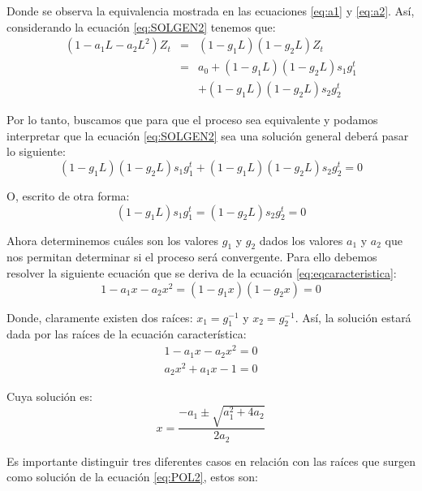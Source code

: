 \documentclass[
]{book}
\begin{document}
Donde se observa la equivalencia mostrada en las ecuaciones \eqref{eq:a1} y \eqref{eq:a2}. Así, considerando la ecuación \eqref{eq:SOLGEN2} tenemos que:
\begin{eqnarray}
    (1 - a_1 L - a_2 L^2) Z_t & = & (1 - g_1 L)(1 - g_2 L) Z_t \nonumber \\
    & = & a_0 + (1 - g_1 L)(1 - g_2 L) s_1 g^t_1 \nonumber \\
    &  & + (1 - g_1 L)(1 - g_2 L) s_2 g^t_2
    \label{eq:eqcaracteristica1}
\end{eqnarray}

Por lo tanto, buscamos que para que el proceso sea equivalente y podamos interpretar que la ecuación \eqref{eq:SOLGEN2} sea una solución general deberá pasar lo siguiente:
\begin{equation}
    (1 - g_1 L) (1 - g_2 L) s_1 g^t_1 + (1 - g_1 L) (1 - g_2 L) s_2 g^t_2 = 0
    \label{eq:eqcaracteristica2}
\end{equation}

O, escrito de otra forma:
\begin{equation}
    (1 - g_1 L) s_1 g^t_1 = (1 - g_2 L) s_2 g^t_2 = 0
    \label{eq:eqcaracteristica3}
\end{equation}

Ahora determinemos cuáles son los valores \(g_1\) y \(g_2\) dados los valores \(a_1\) y \(a_2\) que nos permitan determinar si el proceso será convergente. Para ello debemos resolver la siguiente ecuación que se deriva de la ecuación \eqref{eq:eqcaracteristica}:
\begin{equation}
    1 - a_1 x - a_2 x^2 = (1 - g_1 x)(1 - g_2 x) = 0
    \label{eq:eqcaracteristica4}
\end{equation}

Donde, claramente existen dos raíces: \(x_1 = g^{-1}_1\) y \(x_2 = g^{-1}_2\). Así, la solución estará dada por las raíces de la ecuación característica:
\begin{eqnarray}
    1 - a_1 x - a_2 x^2 = 0 \nonumber \\
    a_2 x^2 + a_1 x - 1 = 0
    \label{eq:POL2}
\end{eqnarray}

Cuya solución es:
\begin{equation}
    x = \frac{- a_1 \pm \sqrt{a^2_1 + 4 a_2}}{2 a_2}
    \label{eq:eqcaracteristica5}
\end{equation}

Es importante distinguir tres diferentes casos en relación con las raíces que surgen como solución de la ecuación \eqref{eq:POL2}, estos son:
\end{document}
